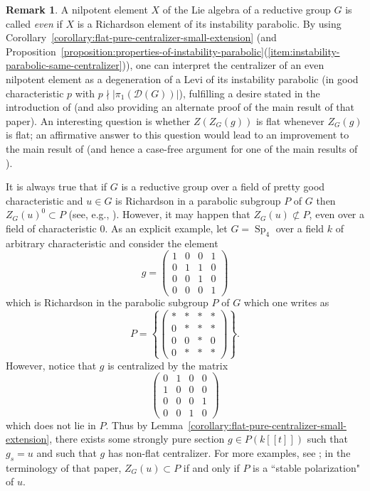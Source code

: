 \documentclass[11pt,reqno]{amsart}
\theoremstyle{definition}
\newtheorem{remark}[theorem]{Remark}
\newcommand{\sD}{{\mathscr D}}
\DeclareMathOperator{\Sp}{Sp}
\begin{document}
\begin{remark}\label{remark:possible-extensions-of-flatness-results}
A nilpotent element $X$ of the Lie algebra of a reductive group $G$ is called \textit{even} if $X$ is a Richardson element of its instability parabolic. By using Corollary~\ref{corollary:flat-pure-centralizer-small-extension} (and Proposition~\ref{proposition:properties-of-instability-parabolic}(\ref{item:instability-parabolic-same-centralizer})), one can interpret the centralizer of an even nilpotent element as a degeneration of a Levi of its instability parabolic (in good characteristic $p$ with $p \nmid |\pi_1(\sD(G))|$), fulfilling a desire stated in the introduction of \cite{McNinch-Testerman} (and also providing an alternate proof of the main result of that paper). An interesting question is whether $Z(Z_G(g))$ is flat whenever $Z_G(g)$ is flat; an affirmative answer to this question would lead to an improvement to the main result of \cite{McNinch-Testerman} (and hence a case-free argument for one of the main results of \cite{Lawther-Testerman}). \smallskip

It is always true that if $G$ is a reductive group over a field of pretty good characteristic and $u \in G$ is Richardson in a parabolic subgroup $P$ of $G$ then $Z_G(u)^0 \subset P$ (see, e.g., \cite[4.9]{Jantzen-nilpotent}). However, it may happen that $Z_G(u) \not\subset P$, even over a field of characteristic $0$. As an explicit example, let $G = \Sp_4$ over a field $k$ of arbitrary characteristic and consider the element
\[
g = \begin{pmatrix}
1 &0 &0 &1 \\
0 &1 &1 &0 \\
0 &0 &1 &0 \\
0 &0 &0 &1
\end{pmatrix}
\]
which is Richardson in the parabolic subgroup $P$ of $G$ which one writes as
\[
P = \left\{\begin{pmatrix}
* &* &* &* \\
0 &* &* &* \\
0 &0 &* &0 \\
0 &* &* &*
\end{pmatrix}\right\}.
\]
However, notice that $g$ is centralized by the matrix
\[
\begin{pmatrix}
0 &1 &0 &0 \\
1 &0 &0 &0 \\
0 &0 &0 &1 \\
0 &0 &1 &0
\end{pmatrix}
\]
which does not lie in $P$. Thus by Lemma~\ref{corollary:flat-pure-centralizer-small-extension}, there exists some strongly pure section $g \in P(k[\![t]\!])$ such that $g_s = u$ and such that $g$ has non-flat centralizer. For more examples, see \cite{Hesselink}; in the terminology of that paper, $Z_G(u) \subset P$ if and only if $P$ is a ``stable polarization" of $u$.


\end{remark}
\end{document}
